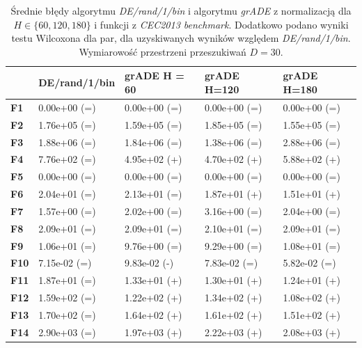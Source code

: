 \documentclass[12pt,a4paper]{report}
\begin{document}
{{{{{{{%

\begin{table}[h]
\centering
\caption{Średnie błędy algorytmu \emph{DE/rand/1/bin} i algorytmu \emph{grADE} z normalizacją dla $H \in \{60, 120, 180\}$ i funkcji z \emph{CEC2013 benchmark}. Dodatkowo podano wyniki testu Wilcoxona dla par, dla uzyskiwanych wyników względem \emph{DE/rand/1/bin}. Wymiarowość przestrzeni przeszukiwań $D = 30$.}
\label{Anal10}
\begin{tabular}{|l|l|l|l|l|}
\hline
          & {\bf DE/rand/1/bin} & {\bf grADE H = 60} & {\bf grADE H=120} & {\bf grADE H=180} \\ \hline
{\bf F1}  & 0.00e+00 (=)        & 0.00e+00 (=)       & 0.00e+00 (=)      & 0.00e+00 (=)      \\ \hline
{\bf F2}  & 1.76e+05 (=)        & 1.59e+05 (=)       & 1.85e+05 (=)      & 1.55e+05 (=)      \\ \hline
{\bf F3}  & 1.88e+06 (=)        & 1.84e+06 (=)       & 1.38e+06 (=)      & 2.88e+06 (=)      \\ \hline
{\bf F4}  & 7.76e+02 (=)        & 4.95e+02 (+)       & 4.70e+02 (+)      & 5.88e+02 (+)      \\ \hline
{\bf F5}  & 0.00e+00 (=)        & 0.00e+00 (=)       & 0.00e+00 (=)      & 0.00e+00 (=)      \\ \hline
{\bf F6}  & 2.04e+01 (=)        & 2.13e+01 (=)       & 1.87e+01 (+)      & 1.51e+01 (+)      \\ \hline
{\bf F7}  & 1.57e+00 (=)        & 2.02e+00 (=)       & 3.16e+00 (=)      & 2.04e+00 (=)      \\ \hline
{\bf F8}  & 2.09e+01 (=)        & 2.09e+01 (=)       & 2.10e+01 (=)      & 2.09e+01 (=)      \\ \hline
{\bf F9}  & 1.06e+01 (=)        & 9.76e+00 (=)       & 9.29e+00 (=)      & 1.08e+01 (=)      \\ \hline
{\bf F10} & 7.15e-02 (=)        & 9.83e-02 (-)       & 7.83e-02 (=)      & 5.82e-02 (=)      \\ \hline
{\bf F11} & 1.87e+01 (=)        & 1.33e+01 (+)       & 1.30e+01 (+)      & 1.24e+01 (+)      \\ \hline
{\bf F12} & 1.59e+02 (=)        & 1.22e+02 (+)       & 1.34e+02 (+)      & 1.08e+02 (+)      \\ \hline
{\bf F13} & 1.70e+02 (=)        & 1.64e+02 (+)       & 1.61e+02 (+)      & 1.51e+02 (+)      \\ \hline
{\bf F14} & 2.90e+03 (=)        & 1.97e+03 (+)       & 2.22e+03 (+)      & 2.08e+03 (+)      \\ \hline

\end{tabular}
\end{table}}}}}}}}
\end{document}
